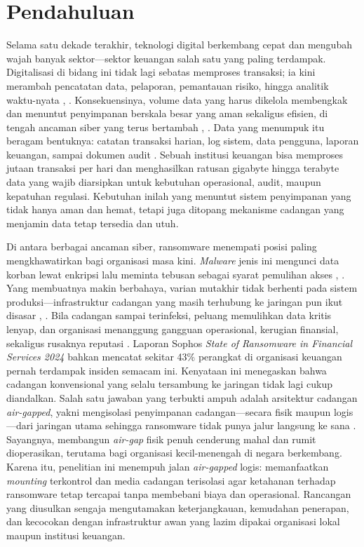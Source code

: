 \documentclass{iaesarticle}
\begin{document}
\section{Pendahuluan}
\label{sec:pendahuluan}
Selama satu dekade terakhir, teknologi digital berkembang cepat dan mengubah wajah banyak sektor---sektor keuangan salah satu yang paling terdampak. Digitalisasi di bidang ini tidak lagi sebatas memproses transaksi; ia kini merambah pencatatan data, pelaporan, pemantauan risiko, hingga analitik waktu-nyata \cite{1}, \cite{2}. Konsekuensinya, volume data yang harus dikelola membengkak dan menuntut penyimpanan berskala besar yang aman sekaligus efisien, di tengah ancaman siber yang terus bertambah \cite{3}, \cite{4}. Data yang menumpuk itu beragam bentuknya: catatan transaksi harian, log sistem, data pengguna, laporan keuangan, sampai dokumen audit \cite{5}. Sebuah institusi keuangan bisa memproses jutaan transaksi per hari dan menghasilkan ratusan gigabyte hingga terabyte data yang wajib diarsipkan untuk kebutuhan operasional, audit, maupun kepatuhan regulasi. Kebutuhan inilah yang menuntut sistem penyimpanan yang tidak hanya aman dan hemat, tetapi juga ditopang mekanisme cadangan yang menjamin data tetap tersedia dan utuh.

Di antara berbagai ancaman siber, ransomware menempati posisi paling mengkhawatirkan bagi organisasi masa kini. \textit{Malware} jenis ini mengunci data korban lewat enkripsi lalu meminta tebusan sebagai syarat pemulihan akses \cite{5}, \cite{6}. Yang membuatnya makin berbahaya, varian mutakhir tidak berhenti pada sistem produksi---infrastruktur cadangan yang masih terhubung ke jaringan pun ikut disasar \cite{7}, \cite{8}. Bila cadangan sampai terinfeksi, peluang memulihkan data kritis lenyap, dan organisasi menanggung gangguan operasional, kerugian finansial, sekaligus rusaknya reputasi \cite{9}. Laporan Sophos \textit{State of Ransomware in Financial Services 2024} bahkan mencatat sekitar 43\% perangkat di organisasi keuangan pernah terdampak insiden semacam ini. Kenyataan ini menegaskan bahwa cadangan konvensional yang selalu tersambung ke jaringan tidak lagi cukup diandalkan. Salah satu jawaban yang terbukti ampuh adalah arsitektur cadangan \textit{air-gapped}, yakni mengisolasi penyimpanan cadangan---secara fisik maupun logis---dari jaringan utama sehingga ransomware tidak punya jalur langsung ke sana \cite{10}. Sayangnya, membangun \textit{air-gap} fisik penuh cenderung mahal dan rumit dioperasikan, terutama bagi organisasi kecil-menengah di negara berkembang. Karena itu, penelitian ini menempuh jalan \textit{air-gapped} logis: memanfaatkan \textit{mounting} terkontrol dan media cadangan terisolasi agar ketahanan terhadap ransomware tetap tercapai tanpa membebani biaya dan operasional. Rancangan yang diusulkan sengaja mengutamakan keterjangkauan, kemudahan penerapan, dan kecocokan dengan infrastruktur awan yang lazim dipakai organisasi lokal maupun institusi keuangan.
\end{document}
